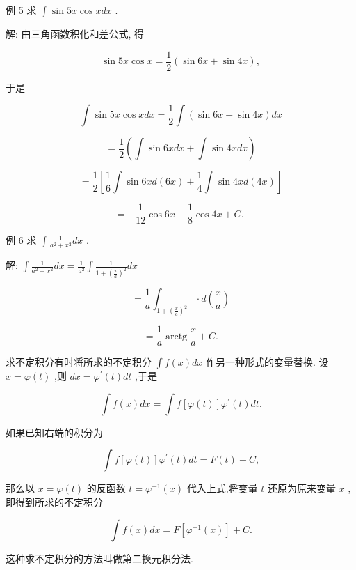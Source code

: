 \documentclass[lang=cn,newtx,10pt,scheme=chinese]{elegantbook}
\begin{document}
例 5 求 \(\int \sin {5x}\cos {xdx}\) .

解: 由三角函数积化和差公式, 得

\[
\sin {5x}\cos x = \frac{1}{2}\left( {\sin {6x} + \sin {4x}}\right) ,
\]

于是

\[
\int \sin {5x}\cos {xdx} = \frac{1}{2}\int \left( {\sin {6x} + \sin {4x}}\right) {dx}
\]

\[
= \frac{1}{2}\left( {\int \sin {6xdx}+\int \sin {4xdx}}\right)
\]

\[
= \frac{1}{2}\left\lbrack {\frac{1}{6}\int \sin {6xd}\left( {6x}\right) + \frac{1}{4}\int \sin {4xd}\left( {4x}\right) }\right\rbrack
\]

\[
= - \frac{1}{12}\cos {6x} - \frac{1}{8}\cos {4x} + C\text{. }
\]

例 6 求 \(\int \frac{1}{{a}^{2} + {x}^{2}}{dx}\) .

解: \(\int \frac{1}{{a}^{2} + {x}^{2}}{dx} = \frac{1}{{a}^{2}}\int \frac{1}{1 + {\left( \frac{x}{a}\right) }^{2}}{dx}\)

\[
= \frac{1}{a}{\int }_{1 + {\left( \frac{x}{a}\right) }^{2}} \cdot d\left( \frac{x}{a}\right)
\]

\[
= \frac{1}{a}\operatorname{arctg}\frac{x}{a} + C.
\]

\begin{proposition}[第二换元积分法]

求不定积分有时将所求的不定积分 \(\int f\left( x\right) {dx}\) 作另一种形式的变量替换. 设 \(x = \varphi \left( t\right)\) ,则 \({dx} = {\varphi }^{\prime }\left( t\right) {dt}\) ,于是

\[
\int f\left( x\right) {dx} = \int f\left\lbrack {\varphi \left( t\right) }\right\rbrack {\varphi }^{\prime }\left( t\right) {dt}.
\]

如果已知右端的积分为

\[
\int f\left\lbrack {\varphi \left( t\right) }\right\rbrack {\varphi }^{\prime }\left( t\right) {dt} = F\left( t\right) + C,
\]

那么以 \(x = \varphi \left( t\right)\) 的反函数 \(t = {\varphi }^{-1}\left( x\right)\) 代入上式,将变量 \(t\) 还原为原来变量 \(x\) ,即得到所求的不定积分

\[
\int f\left( x\right) {dx} = F\left\lbrack {{\varphi }^{-1}\left( x\right) }\right\rbrack + C.
\]

这种求不定积分的方法叫做第二换元积分法.

\end{proposition}
\end{document}
